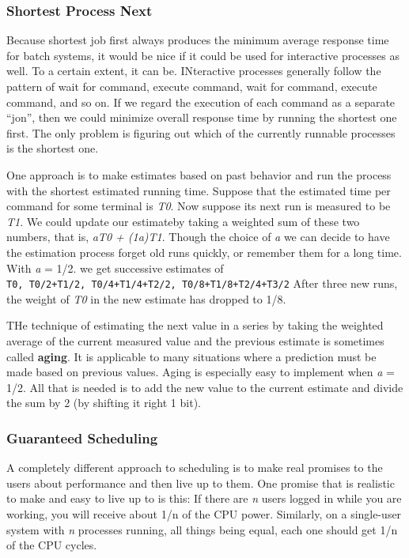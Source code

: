 \documentclass{book}
\newcommand {\kw}  [1] {\textbf{#1}}
\newcommand {\sys} [1] {\textsl{#1}}
\newcommand {\cmd} [1] {\texttt{#1}}
\begin{document}
\subsubsection*{Shortest Process Next}
Because shortest job first always produces the minimum average response time for batch systems,
it would be nice if it could be used for interactive processes as well.
To a certain extent, it can be.
INteractive processes generally follow the pattern of wait for command, execute command, wait for command, execute command, and so on.
If we regard the execution of each command as a separate ``jon'', then we could minimize overall response time by running the shortest one first.
The only problem is figuring out which of the currently runnable processes is the shortest one.

One approach is to make estimates based on past behavior and run the process with the shortest estimated running time.
Suppose that the estimated time per command for some terminal is \sys{T0}.
Now suppose its next run is measured to be \sys{T1}.
We could update our estimateby taking a weighted sum of these two numbers, that is, \sys{aT0 + (1a)T1}.
Though the choice of \sys{a} we can decide to have the estimation process forget old runs quickly, 
or remember them for a long time.
With \sys{a} = 1/2. we get successive estimates of \\
\cmd{T0, T0/2+T1/2, T0/4+T1/4+T2/2, T0/8+T1/8+T2/4+T3/2}
After three new runs, the weight of \sys{T0} in the new estimate has dropped to 1/8.

THe technique of estimating the next value in a series by taking the weighted average 
of the current measured value and the previous estimate is sometimes called \kw{aging}.
It is applicable to many situations where a prediction must be made based on previous values.
Aging is especially easy to implement when \sys{a} = 1/2.
All that is needed is to add the new value to the current estimate and divide the sum by 2 (by shifting it right 1 bit).

\subsubsection*{Guaranteed Scheduling}
A completely different approach to scheduling is to make real promises to the users about performance and then live up to them.
One promise that is realistic to make and easy to live up to is this:
If there are \sys{n} users logged in while you are working, you will receive about 1/n of the CPU power.
Similarly, on a single-user system with \sys{n} processes running, all things being equal, each one should get 1/n of the CPU cycles.
\end{document}
